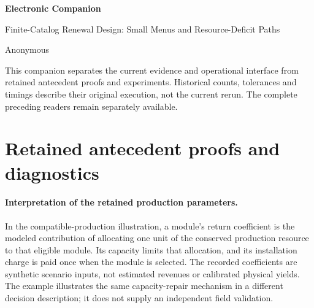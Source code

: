 \documentclass[11pt,letterpaper]{article}
\theoremstyle{definition}\newtheorem{remark}[theorem]{Remark}
\begin{document}
\begin{center}{\Large\bfseries Electronic Companion}\par Finite-Catalog Renewal Design: Small Menus and Resource-Deficit Paths\par Anonymous\end{center}
This companion separates the current evidence and operational interface from retained antecedent proofs and experiments. Historical counts, tolerances and timings describe their original execution, not the current rerun. The complete preceding readers remain separately available.



\section*{Retained antecedent proofs and diagnostics}






\paragraph{Interpretation of the retained production parameters.}
In the compatible-production illustration, a module's return coefficient is the modeled contribution of allocating one unit of the conserved production resource to that eligible module. Its capacity limits that allocation, and its installation charge is paid once when the module is selected. The recorded coefficients are synthetic scenario inputs, not estimated revenues or calibrated physical yields. The example illustrates the same capacity-repair mechanism in a different decision description; it does not supply an independent field validation.
\clearpage

\clearpage



\end{document}
